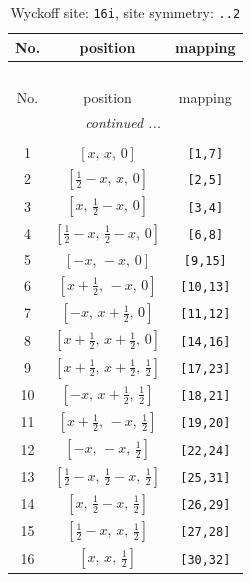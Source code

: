 \documentclass[fleqn,8pt]{jsarticle}
\begin{document}
\begin{longtable}{ccc}
\caption{Wyckoff site: {\tt 16i}, site symmetry: {\tt ..2}}
 \\
 \hline \hline
No. & position & mapping \\ \hline \endfirsthead

\multicolumn{2}{l}{\tablename\ \thetable{}} \\
 \hline \hline
No. & position & mapping \\ \hline \endhead

 \hline \hline
\multicolumn{2}{r}{\footnotesize\it continued ...} \\ \endfoot

 \hline \hline
\multicolumn{2}{r}{} \\ \endlastfoot

1 & $\left[ x,\, x,\, 0 \right]$ & {\tt [1,7]} \\ \hline
2 & $\left[ \frac{1}{2} - x,\, x,\, 0 \right]$ & {\tt [2,5]} \\ \hline
3 & $\left[ x,\, \frac{1}{2} - x,\, 0 \right]$ & {\tt [3,4]} \\ \hline
4 & $\left[ \frac{1}{2} - x,\, \frac{1}{2} - x,\, 0 \right]$ & {\tt [6,8]} \\ \hline
5 & $\left[ - x,\, - x,\, 0 \right]$ & {\tt [9,15]} \\ \hline
6 & $\left[ x + \frac{1}{2},\, - x,\, 0 \right]$ & {\tt [10,13]} \\ \hline
7 & $\left[ - x,\, x + \frac{1}{2},\, 0 \right]$ & {\tt [11,12]} \\ \hline
8 & $\left[ x + \frac{1}{2},\, x + \frac{1}{2},\, 0 \right]$ & {\tt [14,16]} \\ \hline
9 & $\left[ x + \frac{1}{2},\, x + \frac{1}{2},\, \frac{1}{2} \right]$ & {\tt [17,23]} \\ \hline
10 & $\left[ - x,\, x + \frac{1}{2},\, \frac{1}{2} \right]$ & {\tt [18,21]} \\ \hline
11 & $\left[ x + \frac{1}{2},\, - x,\, \frac{1}{2} \right]$ & {\tt [19,20]} \\ \hline
12 & $\left[ - x,\, - x,\, \frac{1}{2} \right]$ & {\tt [22,24]} \\ \hline
13 & $\left[ \frac{1}{2} - x,\, \frac{1}{2} - x,\, \frac{1}{2} \right]$ & {\tt [25,31]} \\ \hline
14 & $\left[ x,\, \frac{1}{2} - x,\, \frac{1}{2} \right]$ & {\tt [26,29]} \\ \hline
15 & $\left[ \frac{1}{2} - x,\, x,\, \frac{1}{2} \right]$ & {\tt [27,28]} \\ \hline
16 & $\left[ x,\, x,\, \frac{1}{2} \right]$ & {\tt [30,32]} \\
\end{longtable}
\end{document}
